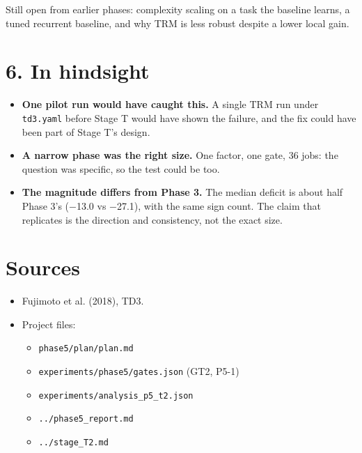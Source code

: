 \documentclass[11pt]{article}
\begin{document}
Still open from earlier phases: complexity scaling on a task the baseline learns, a tuned recurrent baseline, and why TRM is less robust despite a lower local gain.



\section*{6. In hindsight}



\begin{itemize}
\item \textbf{One pilot run would have caught this.} A single TRM run under \texttt{td3.yaml} before Stage T would have shown the failure, and the fix could have been part of Stage T's design.
\item \textbf{A narrow phase was the right size.} One factor, one gate, 36 jobs: the question was specific, so the test could be too.
\item \textbf{The magnitude differs from Phase 3.} The median deficit is about half Phase 3's ($-$13.0 vs $-$27.1), with the same sign count. The claim that replicates is the direction and consistency, not the exact size.
\end{itemize}



\section*{Sources}



\begin{itemize}
\item Fujimoto et al. (2018), TD3.
\item Project files:
\begin{itemize}
\item \texttt{phase5/\allowbreak{}plan/\allowbreak{}plan.\allowbreak{}md}
\item \texttt{experiments/\allowbreak{}phase5/\allowbreak{}gates.\allowbreak{}json} (GT2, P5-1)
\item \texttt{experiments/\allowbreak{}analysis\_\allowbreak{}p5\_\allowbreak{}t2.\allowbreak{}json}
\item \texttt{.\allowbreak{}.\allowbreak{}/\allowbreak{}phase5\_\allowbreak{}report.\allowbreak{}md}
\item \texttt{.\allowbreak{}.\allowbreak{}/\allowbreak{}stage\_\allowbreak{}T2.\allowbreak{}md}
\end{itemize}
\end{itemize}
\end{document}
